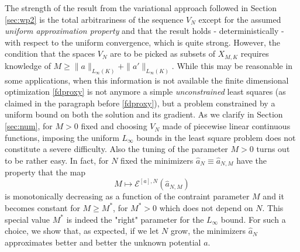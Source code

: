 The strength of the result from the variational approach followed in Section \ref{sec:wp2} is the total arbitrariness of the sequence $V_N$ except
for the assumed {\it uniform approximation property} and that the result holds - deterministically - with respect to the uniform convergence, which is quite strong.  However,
the condition that the spaces $V_N$ are to be picked as subsets of $X_{M,K}$ requires knowledge of $M \geq \|a\|_{L_{\infty}(K)} + \|a'\|_{L_{\infty}(K)}$. While this may be reasonable in some applications, when this information is not available 
the finite dimensional optimization \eqref{fdproxy} is not anymore a simple {\it unconstrained} least squares (as claimed in the paragraph before \eqref{fdproxy}),
but a problem constrained by a uniform bound on both the solution and its gradient. 
As we clarify in Section \ref{sec:num}, for $M>0$ fixed and choosing $V_N$ made of piecewise linear continuous functions, imposing the uniform $L_\infty$ bounds in the least square problem does not constitute a severe difficulty.
Also the tuning of the parameter $M>0$ turns out to be rather easy. In fact, for $N$ fixed the minimizers $\widehat a_N \equiv \widehat a_{N,M}$ have the property that the map
$$
 M \mapsto   \mathcal E^{[a],N}(\widehat a_{N,M})
$$
is monotonically decreasing as a function of the contraint parameter $M$ and it becomes constant for $M\geq M^*$, for $M^*>0$ which does not depend on $N$. This special value $M^*$ is indeed the "right" parameter for the $L_\infty$ bound. For such a choice, we show that, as expected, if we let $N$ grow, the minimizers $\widehat{a}_N$ approximates better and better the unknown potential $a$. 
\\

